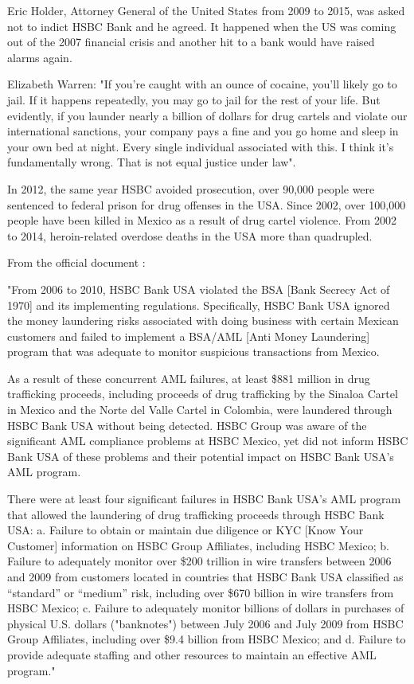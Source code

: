 Eric Holder, Attorney General of the United States from 2009 to 2015, was asked not to indict HSBC Bank and he agreed. It happened when the US was coming out of the 2007 financial crisis and another hit to a bank would have raised alarms again.

Elizabeth Warren: "If you're caught with an ounce of cocaine, you'll likely go to jail. If it happens repeatedly, you may go to jail for the rest of your life. But evidently, if you launder nearly a billion of dollars for drug cartels and violate our international sanctions, your company pays a fine and you go home and sleep in your own bed at night. Every single individual associated with this. I think it's fundamentally wrong. That is not equal justice under law".

In 2012, the same year HSBC avoided prosecution, over 90,000 people were sentenced to federal prison for drug offenses in the USA. Since 2002, over 100,000 people have been killed in Mexico as a result of drug cartel violence. From 2002 to 2014, heroin-related overdose deaths in the USA more than quadrupled.

From the official document \citep{HSBC}:

"From 2006 to 2010, HSBC Bank USA violated the BSA [Bank Secrecy Act of 1970] and its implementing regulations. Specifically, HSBC Bank USA ignored the money laundering risks associated with doing business with certain Mexican customers and failed to implement a BSA/AML [Anti Money Laundering] program that was adequate to monitor suspicious transactions from Mexico.

As a result of these concurrent AML failures, at least \$881 million in drug trafficking proceeds, including proceeds of drug trafficking by the Sinaloa Cartel in Mexico and the Norte del Valle Cartel in Colombia, were laundered through HSBC Bank USA without being detected. HSBC Group was aware of the significant AML compliance problems at HSBC Mexico, yet did not inform HSBC Bank USA of these problems and their potential impact on HSBC Bank USA’s AML program.

There were at least four significant failures in HSBC Bank USA’s AML program that allowed the laundering of drug trafficking proceeds through HSBC Bank USA:
a. Failure to obtain or maintain due diligence or KYC [Know Your Customer] information on HSBC Group Affiliates, including HSBC Mexico; 
b. Failure to adequately monitor over \$200 trillion in wire transfers between 2006 and 2009 from customers located in countries that HSBC Bank USA classified as “standard” or “medium” risk, including over \$670 billion in wire transfers from HSBC Mexico; 
c. Failure to adequately monitor billions of dollars in purchases of physical U.S. dollars ("banknotes") between July 2006 and July 2009 from HSBC Group Affiliates, including over \$9.4 billion from HSBC Mexico; and 
d. Failure to provide adequate staffing and other resources to maintain an effective AML program."


